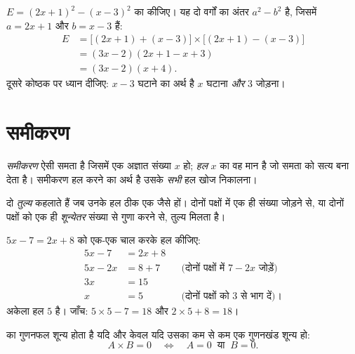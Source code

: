 \begin{example}\label{ex:g10:algebra:factorsteps}
$E = (2x + 1)^2 - (x - 3)^2$ का  कीजिए। यह दो वर्गों का अंतर $a^2 - b^2$ है, जिसमें $a = 2x+1$ और
$b = x-3$ हैं:
\begin{align*}
E &= \bigl[(2x+1) + (x-3)\bigr] \times \bigl[(2x+1) - (x-3)\bigr] \\
  &= (3x - 2)(2x + 1 - x + 3) \\
  &= (3x - 2)(x + 4).
\end{align*}
दूसरे कोष्ठक पर ध्यान दीजिए: $x - 3$ घटाने का अर्थ है $x$ घटाना \emph{और}
$3$ जोड़ना।
\end{example}

\section{समीकरण}

\begin{definition}[समीकरण, हल]\label{def:g10:algebra:equation}
\emph{समीकरण} ऐसी समता है जिसमें एक अज्ञात संख्या $x$ हो;
\emph{हल} $x$ का वह मान है जो समता को सत्य बना देता है। समीकरण हल करने का
अर्थ है उसके \emph{सभी} हल खोज निकालना।
\end{definition}

दो  \emph{तुल्य} कहलाते हैं जब उनके हल ठीक एक जैसे हों। दोनों पक्षों
में एक ही संख्या जोड़ने से, या दोनों पक्षों को एक ही \emph{शून्येतर} संख्या
से गुणा करने से, तुल्य  मिलता है।

\begin{example}\label{ex:g10:algebra:firstdegree}
$5x - 7 = 2x + 8$ को एक-एक चाल करके हल कीजिए:
\begin{align*}
5x - 7 &= 2x + 8 \\
5x - 2x &= 8 + 7 && \text{(दोनों पक्षों में $7 - 2x$ जोड़ें)} \\
3x &= 15 \\
x &= 5 && \text{(दोनों पक्षों को $3$ से भाग दें)।}
\end{align*}
अकेला हल $5$ है। जाँच: $5 \times 5 - 7 = 18$ और $2 \times 5 + 8 = 18$।
\end{example}

\begin{theorem}[शून्य-गुणनफल नियम]\label{thm:g10:algebra:zeroproduct}
 का गुणनफल शून्य होता है यदि और केवल यदि उसका कम से कम एक
गुणनखंड शून्य हो:
\[
A \times B = 0
\quad\Longleftrightarrow\quad
A = 0 \ \text{ या } \ B = 0 .
\]
\end{theorem}

